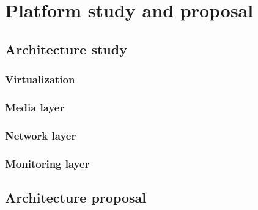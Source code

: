 \chapter{Platform study and proposal}\label{B:platformStudyAndProposal}

\section{Architecture study}
\subsection{Virtualization}
\subsection{Media layer}
\subsection{Network layer}
\subsection{Monitoring layer}
\section{Architecture proposal}



